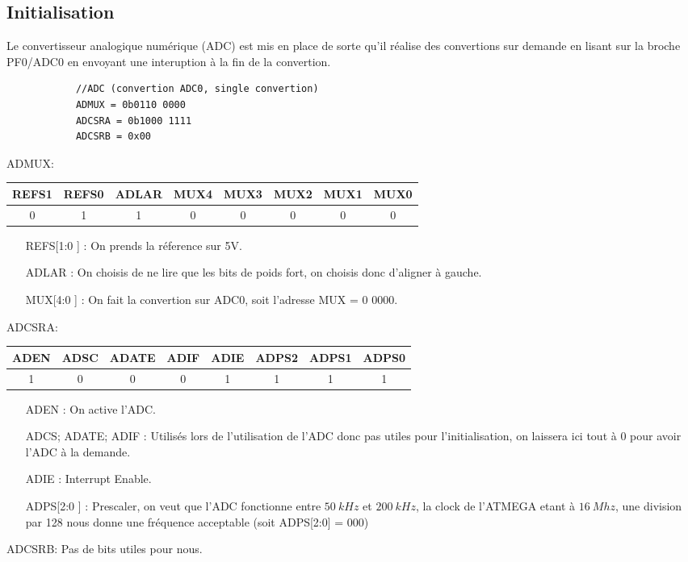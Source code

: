 \documentclass[a4paper, 12pt]{article}
\begin{document}
		\subsection{Initialisation}
		Le convertisseur analogique numérique (ADC) est mis en place de sorte qu'il réalise des convertions sur demande en lisant sur la broche PF0/ADC0 en envoyant une interuption à la fin de la convertion.
		\begin{lstlisting}
			//ADC (convertion ADC0, single convertion)
			ADMUX = 0b0110 0000
			ADCSRA = 0b1000 1111
			ADCSRB = 0x00
		\end{lstlisting}
		\newpage
		ADMUX:
		\begin{center}
		\begin{tabular}{|c|c|c|c|c|c|c|c|}
		\hline
		REFS1 & REFS0 & ADLAR & MUX4 & MUX3 & MUX2 & MUX1 & MUX0\\
		\hline
		0 & 1 & 1 & 0 & 0 & 0 & 0 & 0\\
		\hline
		\end{tabular}
		\end{center}
		\begin{itemize}
			\item[REFS[1:0]] : On prends la réference sur 5V.
			\item[ADLAR] : On choisis de ne lire que les bits de poids fort, on choisis donc d'aligner à gauche.
			\item[MUX[4:0]] : On fait la convertion sur ADC0, soit l'adresse MUX = 0 0000.
		\end{itemize}
		
		ADCSRA:
		\begin{center}
			\begin{tabular}{|c|c|c|c|c|c|c|c|}
				\hline
				ADEN & ADSC & ADATE & ADIF & ADIE & ADPS2 & ADPS1 & ADPS0\\
				\hline
				1 & 0 & 0 & 0 & 1 & 1 & 1 & 1\\
				\hline
			\end{tabular}
		\end{center}
		\begin{itemize}
			\item[ADEN] : On active l'ADC.
			\item[ADCS; ADATE; ADIF] : Utilisés lors de l'utilisation de l'ADC donc pas utiles pour l'initialisation, on laissera ici tout à 0 pour avoir l'ADC à la demande.
			\item[ADIE] : Interrupt Enable.
			\item[ADPS[2:0]] : Prescaler, on veut que l'ADC fonctionne entre $50\ kHz$ et $200\ kHz$, la clock de l'ATMEGA etant à $16\ Mhz$, une division par 128 nous donne une fréquence acceptable (soit ADPS[2:0] = 000)
		\end{itemize}
		ADCSRB: Pas de bits utiles pour nous.\\
		
\end{document}
